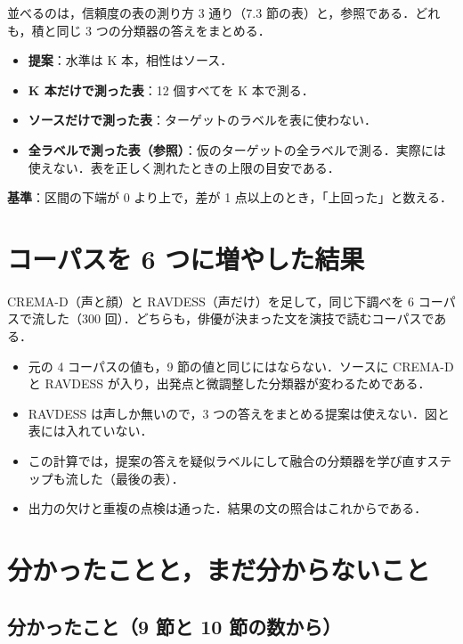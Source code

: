 \documentclass[a4paper,11pt]{ltjsarticle}
\begin{document}
並べるのは，信頼度の表の測り方 3 通り（7.3 節の表）と，参照である．どれも，積と同じ 3 つの分類器の答えをまとめる．
\begin{itemize}
  \item \textbf{提案}：水準は K 本，相性はソース．
  \item \textbf{K 本だけで測った表}：12 個すべてを K 本で測る．
  \item \textbf{ソースだけで測った表}：ターゲットのラベルを表に使わない．
  \item \textbf{全ラベルで測った表（参照）}：仮のターゲットの全ラベルで測る．実際には使えない．表を正しく測れたときの上限の目安である．
\end{itemize}
\textbf{基準}：区間の下端が 0 より上で，差が 1 点以上のとき，「上回った」と数える．



\section{コーパスを 6 つに増やした結果}

CREMA-D（声と顔）と RAVDESS（声だけ）を足して，同じ下調べを 6 コーパスで流した（300 回）．どちらも，俳優が決まった文を演技で読むコーパスである．
\begin{itemize}
  \item 元の 4 コーパスの値も，9 節の値と同じにはならない．ソースに CREMA-D と RAVDESS が入り，出発点と微調整した分類器が変わるためである．
  \item RAVDESS は声しか無いので，3 つの答えをまとめる提案は使えない．図と表には入れていない．
  \item この計算では，提案の答えを疑似ラベルにして融合の分類器を学び直すステップも流した（最後の表）．
  \item 出力の欠けと重複の点検は通った．結果の文の照合はこれからである．
\end{itemize}



\section{分かったことと，まだ分からないこと}

\subsection*{分かったこと（9 節と 10 節の数から）}
\end{document}
